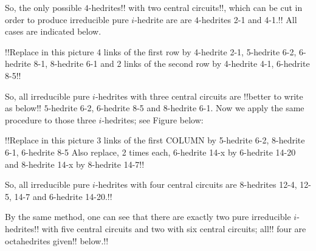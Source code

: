 \documentclass[12pt]{article}
\begin{document}
\begin{center}
\epsfxsize=40mm
\end{center}



So, the only possible $4$-hedrites!! with two central circuits!!, which can be cut in order to produce irreducible pure $i$-hedrite are 
are $4$-hedrites 2-1 and 4-1.!!
All cases are indicated below. 

\begin{center}
\epsfxsize=120mm
\end{center}
!!Replace in this picture 4 links of the first row by 4-hedrite 2-1,
5-hedrite 6-2, 6-hedrite 8-1, 8-hedrite 6-1
and 2 links of the second row by 4-hedrite 4-1, 6-hedrite 8-5!!

So, all irreducible pure $i$-hedrites with three central circuits are 
!!better to write as below!!
$5$-hedrite 6-2, $6$-hedrite 8-5 and $8$-hedrite 6-1. 
Now we apply the same procedure to those three $i$-hedrites; see Figure below:

\begin{center}
\epsfxsize=120mm
\end{center}
!!Replace in this picture 3 links of the first COLUMN by 5-hedrite 6-2,
8-hedrite 6-1, 6-hedrite 8-5
Also replace, 2 times each, 6-hedrite 14-x by 6-hedrite 14-20
and 8-hedrite 14-x by 8-hedrite 14-7!!

So, all irreducible pure $i$-hedrites with four central circuits are $8$-hedrites 12-4, 12-5, 14-7 and $6$-hedrite 14-20.!!

By the same method, one can see that there are exactly two pure irreducible $i$-hedrites!! with five central circuits and two with six central 
circuits; all!! four are octahedrites given!! below.!!
\end{document}
